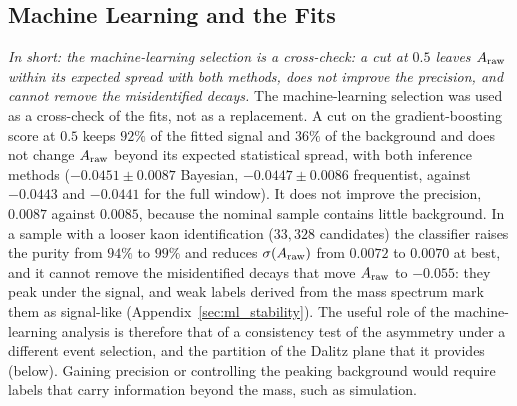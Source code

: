 \subsection{Machine Learning and the Fits}
\label{sec:comparison_ml}
\emph{In short: the machine-learning selection is a cross-check: a cut at $0.5$ leaves $A_{\mathrm{raw}}$ within its expected spread with both methods, does not improve the precision, and cannot remove the misidentified decays.}
The machine-learning selection was used as a cross-check of the fits, not as a replacement. A cut on the gradient-boosting score at $0.5$ keeps $92\%$ of the fitted signal and $36\%$ of the background and does not change $A_{\mathrm{raw}}$ beyond its expected statistical spread, with both inference methods ($-0.0451\pm0.0087$ Bayesian, $-0.0447\pm0.0086$ frequentist, against $-0.0443$ and $-0.0441$ for the full window). It does not improve the precision, $0.0087$ against $0.0085$, because the nominal sample contains little background. In a sample with a looser kaon identification ($33{,}328$ candidates) the classifier raises the purity from $94\%$ to $99\%$ and reduces $\sigma(A_{\mathrm{raw}})$ from $0.0072$ to $0.0070$ at best, and it cannot remove the misidentified decays that move $A_{\mathrm{raw}}$ to $-0.055$: they peak under the signal, and weak labels derived from the mass spectrum mark them as signal-like (Appendix~\ref{sec:ml_stability}). The useful role of the machine-learning analysis is therefore that of a consistency test of the asymmetry under a different event selection, and the partition of the Dalitz plane that it provides (below). Gaining precision or controlling the peaking background would require labels that carry information beyond the mass, such as simulation.

